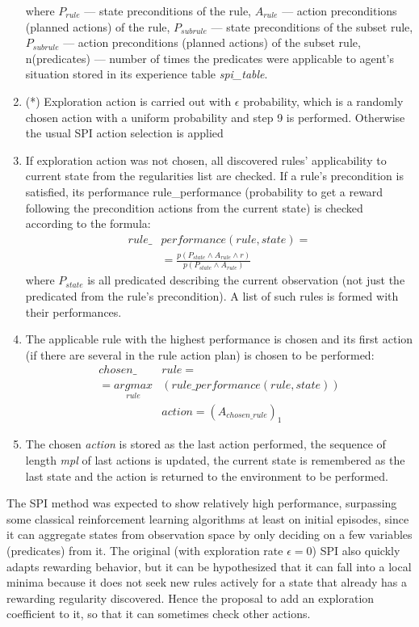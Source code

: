 \documentclass[a4paper,twocolumn]{article}
\begin{document}
\begin{enumerate}[label=\arabic*)]
{where $P_{rule}$ --- state preconditions of the rule, $A_{rule}$ --- action preconditions (planned actions) of the rule, $P_{subrule}$ — state preconditions of the subset rule, $P_{subrule}$ --- action preconditions (planned actions) of the subset rule, n(predicates) --- number of times the predicates were applicable to agent’s situation stored in its experience table {\slshape spi\_table}.}

	\item{(*) Exploration action is carried out with $\epsilon$ probability, which is a randomly chosen action with a uniform probability and step 9 is performed. Otherwise the usual SPI action selection is applied}

	\item{If exploration action was not chosen, all discovered rules’ applicability to current state from the regularities list are checked. If a rule’s precondition is satisfied, its performance rule\_performance (probability to get a reward following the precondition actions from the current state) is checked according to the formula:
	\begin{align*}
	rule\_& performance(rule,state)=\\ & =\frac{p(P_{state} \wedge A_{rule} \wedge r)}{p(P_{state} \wedge A_{rule})} \nonumber
	\end{align*}
where $P_{state}$ is all predicated describing the current observation (not just the predicated from the rule’s precondition). A list of such rules is formed with their performances.}
	
	\item{The applicable rule with the highest performance is chosen and its first action (if there are several in the rule action plan) is chosen to be performed:
	\begin{align*}
	chosen\_&rule=\\=\underset{rule}{argmax}&(rule\_performance(rule,state))\\
	&action=(A_{chosen\_rule})_1	 \nonumber
	\end{align*}}
	
	\item{The chosen {\slshape action} is stored as the last action performed,
the sequence of length {\slshape mpl} of last actions is updated,
the current state is remembered as the last state and the
action is returned to the environment to be performed.}
\end{enumerate}

	The SPI method was expected to show relatively high performance, surpassing some classical reinforcement learning algorithms at least on initial episodes, since it can aggregate states from observation space by only deciding on a few variables (predicates) from it. The original (with exploration rate $\epsilon = 0$) SPI also quickly adapts rewarding behavior, but it can be hypothesized that it can fall into a local minima because it does not seek new rules actively for a state that already has a rewarding regularity discovered. Hence the proposal to add an exploration coefficient to it, so that it can sometimes check other actions.
\end{document}
